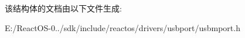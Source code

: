 该结构体的文档由以下文件生成\+:\begin{DoxyCompactItemize}
\item 
E\+:/\+React\+O\+S-\/0../sdk/include/reactos/drivers/usbport/usbmport.\+h\end{DoxyCompactItemize}
